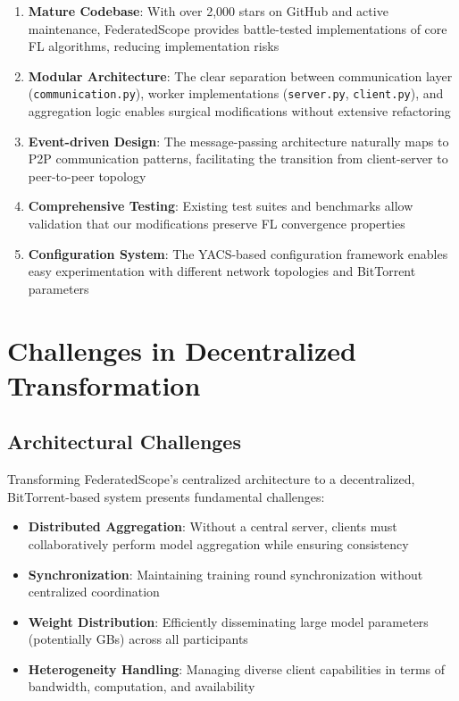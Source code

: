 \documentclass[11pt,conference]{article}
\begin{document}
\begin{enumerate}
    \item \textbf{Mature Codebase}: With over 2,000 stars on GitHub and active maintenance, FederatedScope provides battle-tested implementations of core FL algorithms, reducing implementation risks
    
    \item \textbf{Modular Architecture}: The clear separation between communication layer (\texttt{communication.py}), worker implementations (\texttt{server.py}, \texttt{client.py}), and aggregation logic enables surgical modifications without extensive refactoring
    
    \item \textbf{Event-driven Design}: The message-passing architecture naturally maps to P2P communication patterns, facilitating the transition from client-server to peer-to-peer topology
    
    \item \textbf{Comprehensive Testing}: Existing test suites and benchmarks allow validation that our modifications preserve FL convergence properties
    
    \item \textbf{Configuration System}: The YACS-based configuration framework enables easy experimentation with different network topologies and BitTorrent parameters
\end{enumerate}

\section{Challenges in Decentralized Transformation}

\subsection{Architectural Challenges}

Transforming FederatedScope's centralized architecture to a decentralized, BitTorrent-based system presents fundamental challenges:

\begin{itemize}
    \item \textbf{Distributed Aggregation}: Without a central server, clients must collaboratively perform model aggregation while ensuring consistency
    \item \textbf{Synchronization}: Maintaining training round synchronization without centralized coordination
    \item \textbf{Weight Distribution}: Efficiently disseminating large model parameters (potentially GBs) across all participants
    \item \textbf{Heterogeneity Handling}: Managing diverse client capabilities in terms of bandwidth, computation, and availability
\end{itemize}
\end{document}
